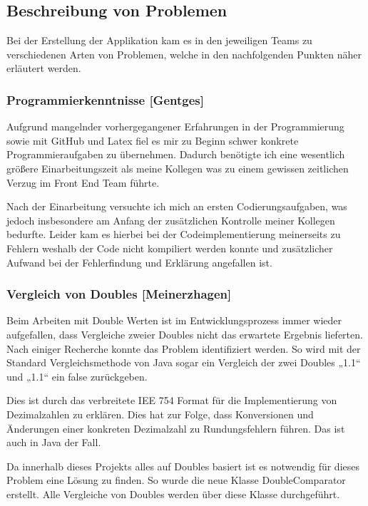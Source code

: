 \clearpage

\subsection{Beschreibung von Problemen}

Bei der Erstellung der Applikation kam es in den jeweiligen Teams zu verschiedenen Arten von Problemen, welche in den nachfolgenden Punkten näher erläutert werden.

\subsubsection{Programmierkenntnisse [Gentges]}

Aufgrund mangelnder vorhergegangener Erfahrungen in der Programmierung sowie mit GitHub und Latex fiel es mir zu Beginn schwer konkrete Programmieraufgaben zu übernehmen. Dadurch benötigte ich eine wesentlich größere Einarbeitungszeit als meine Kollegen was zu einem gewissen zeitlichen Verzug im Front End Team führte.

Nach der Einarbeitung versuchte ich mich an ersten Codierungsaufgaben, was jedoch insbesondere am Anfang der zusätzlichen Kontrolle meiner Kollegen bedurfte. 
Leider kam es hierbei bei der Codeimplementierung meinerseits zu Fehlern weshalb der Code nicht kompiliert werden konnte und zusätzlicher Aufwand bei der Fehlerfindung und Erklärung angefallen ist. 

\subsubsection{Vergleich von Doubles [Meinerzhagen]}
Beim Arbeiten mit Double Werten ist im Entwicklungsprozess immer wieder aufgefallen, dass Vergleiche zweier Doubles nicht das erwartete Ergebnis lieferten. Nach einiger Recherche konnte das Problem identifiziert werden. So wird mit der Standard Vergleichsmethode von Java sogar ein  Vergleich der zwei Doubles „1.1“ und „1.1“ ein false zurückgeben.

Dies ist durch das verbreitete IEE 754 Format für die Implementierung von Dezimalzahlen zu erklären. Dies hat zur Folge, dass Konversionen und Änderungen einer konkreten Dezimalzahl zu Rundungsfehlern führen. Das ist auch in Java der Fall.

Da innerhalb dieses Projekts alles auf Doubles basiert ist es notwendig für dieses Problem eine Lösung zu finden. So wurde die neue Klasse DoubleComparator erstellt. Alle Vergleiche von Doubles werden über diese Klasse durchgeführt.


